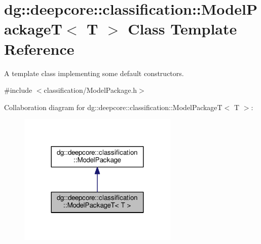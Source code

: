 \hypertarget{classdg_1_1deepcore_1_1classification_1_1_model_package_t}{}\section{dg\+:\+:deepcore\+:\+:classification\+:\+:Model\+PackageT$<$ T $>$ Class Template Reference}
\label{classdg_1_1deepcore_1_1classification_1_1_model_package_t}


A template class implementing some default constructors.  




{\ttfamily \#include $<$classification/\+Model\+Package.\+h$>$}



Collaboration diagram for dg\+:\+:deepcore\+:\+:classification\+:\+:Model\+PackageT$<$ T $>$\+:
\nopagebreak
\begin{figure}[H]
\begin{center}
\leavevmode
\includegraphics[width=216pt]{classdg_1_1deepcore_1_1classification_1_1_model_package_t__coll__graph}
\end{center}
\end{figure}
